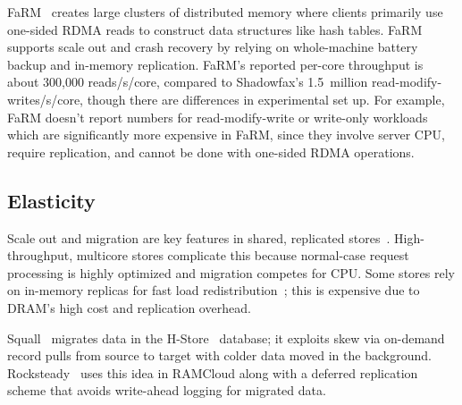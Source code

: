 
FaRM~\cite{farm-2014,farm-txns} creates large clusters of distributed memory where
clients primarily use one-sided RDMA reads to construct data structures like
hash tables. FaRM supports scale out and crash recovery by relying on
whole-machine battery backup and in-memory replication.  FaRM's reported
per-core throughput is about 300,000 reads/s/core, compared to Shadowfax's
1.5~million read-modify-writes/s/core, though there are differences in
experimental set up. For example, FaRM doesn't report numbers for
read-modify-write or write-only workloads which are significantly more
expensive in FaRM, since they involve server CPU, require replication, and
cannot be done with one-sided RDMA operations.


\subsection{Elasticity}
Scale out and migration are key features in shared,
replicated stores~\cite{dynamo,cassandra,redis}.  High-throughput, multicore
stores complicate this because normal-case request processing is highly
optimized and migration competes for CPU.  Some stores rely on
in-memory replicas for fast load redistribution~\cite{farm-txns,drtmb};
this is expensive due to DRAM's high cost and
replication overhead.

Squall~\cite{squall} migrates data in the H-Store~\cite{hstore}
database; it exploits skew via on-demand record pulls from
source to target with colder data moved in the background.
Rocksteady~\cite{rocksteady} uses this idea in RAMCloud along with a
deferred replication scheme that avoids write-ahead logging for
migrated data.
